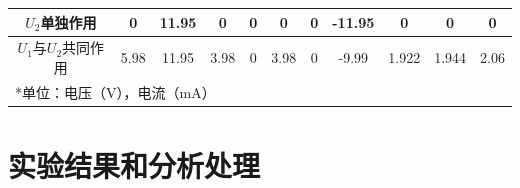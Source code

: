 \documentclass{../source/Experiment}
\begin{document}
\begin{enumerate}
\begin{table}[htbp]
\begin{center}
\begin{tabular}{|c|c|c|c|c|c|c|c|c|c|c|}
                            $U_2$单独作用       & 0     & 11.95 & 0     & 0     & 0     & 0        & -11.95   & 0        & 0        & 0        \\ \hline
                            $U_1$与$U_2$共同作用 & 5.98  & 11.95 & 3.98  & 0     & 3.98  & 0        & -9.99    & 1.922    & 1.944    & 2.06     \\ \hline
                            \multicolumn{11}{l}{*单位：电压（V），电流（mA）}                                                                         
                        \end{tabular}
                    \end{center}
                \end{table}
            \end{enumerate}
    \section{实验结果和分析处理}
\end{document}
